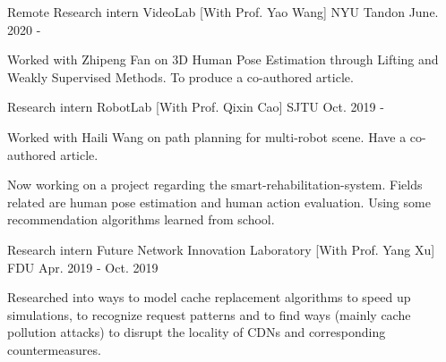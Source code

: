 

\begin{cventries}
  \cventry
    {Remote Research intern} %
    {VideoLab [With Prof. Yao Wang]} %
    {NYU Tandon} %
    {June. 2020 - } %
    {
      \begin{cvitems} %
        \item {Worked with Zhipeng Fan on 3D Human Pose Estimation through Lifting and Weakly Supervised Methods. To produce a co-authored article.}
      \end{cvitems}
    }


  \cventry
    {Research intern} %
    {RobotLab [With Prof. Qixin Cao]} %
    {SJTU} %
    {Oct. 2019 - } %
    {
      \begin{cvitems} %
        \item {Worked with Haili Wang on path planning for multi-robot scene. Have a co-authored article.}
        \item {Now working on a project regarding the smart-rehabilitation-system. Fields related are human pose estimation and human action evaluation. Using some recommendation algorithms learned from school.}
      \end{cvitems}
    }


  \cventry
    {Research intern} %
    {Future Network Innovation Laboratory [With Prof. Yang Xu]} %
    {FDU} %
    {Apr. 2019 - Oct. 2019} %
    {
      \begin{cvitems} %
        \item {Researched into ways to model cache replacement algorithms to speed up simulations, to recognize request patterns and to find ways (mainly cache pollution attacks) to disrupt the locality of CDNs and corresponding countermeasures.}
      \end{cvitems}
    }


\end{cventries}
